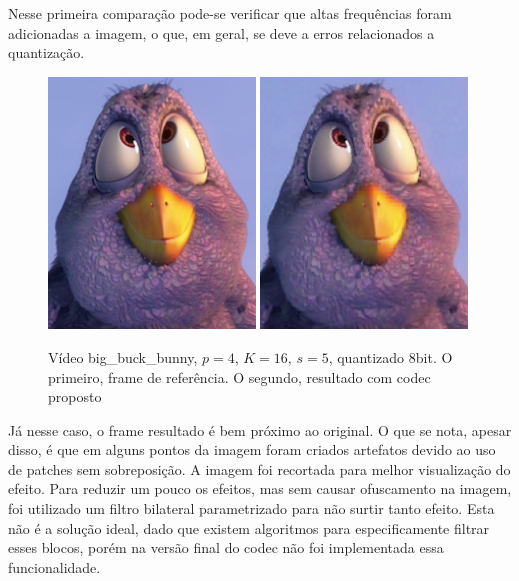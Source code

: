 \documentclass[cic,tc]{iiufrgs}
\begin{document}
Nesse primeira comparação pode-se verificar que altas frequências foram adicionadas a imagem, o que, 
em geral, se deve a erros relacionados a quantização.

\begin{figure}[H]
    \caption{Vídeo big\_buck\_bunny, $p=4$, $K=16$, $s=5$, quantizado 8bit. O primeiro, frame de referência. 
    O segundo, resultado com codec proposto}
    \begin{center}
        \includegraphics[width=0.49\textwidth]{img/bbbref.png}
        \includegraphics[width=0.49\textwidth]{img/bbbres.png}
    \end{center}
    \label{fig:bbbres}
\end{figure}

Já nesse caso, o frame resultado é bem próximo ao original. 
O que se nota, apesar disso, é que em alguns pontos da imagem foram criados artefatos devido ao 
uso de patches sem sobreposição.
A imagem foi recortada para melhor visualização do efeito.
Para reduzir um pouco os efeitos, mas sem causar ofuscamento na imagem, foi utilizado um filtro 
bilateral parametrizado para não surtir tanto efeito.
Esta não é a solução ideal, dado que existem algoritmos para especificamente filtrar esses blocos,
porém na versão final do codec não foi implementada essa funcionalidade.
\end{document}
